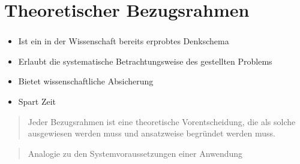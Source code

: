 \documentclass[aspectratio=169]{beamer}
\begin{document}
\section{Theoretischer Bezugsrahmen}
\begin{frame}
  \frametitle{\insertsection}%
  \framesubtitle{\insertsubsection}%
  \begin{itemize}
   \item Ist ein in der Wissenschaft bereits erprobtes Denkschema
   \item Erlaubt die systematische Betrachtungsweise des gestellten Problems
   \item Bietet wissenschaftliche Absicherung
   \item Spart Zeit
  \end{itemize}
  \begin{quote}
   Jeder Bezugsrahmen ist eine theoretische Vorentscheidung, die als solche ausgewiesen werden muss und ansatzweise begründet werden muss.
  \end{quote}
  \begin{quote}
   Analogie zu den Systemvoraussetzungen einer Anwendung
  \end{quote}
\end{frame}
\end{document}
